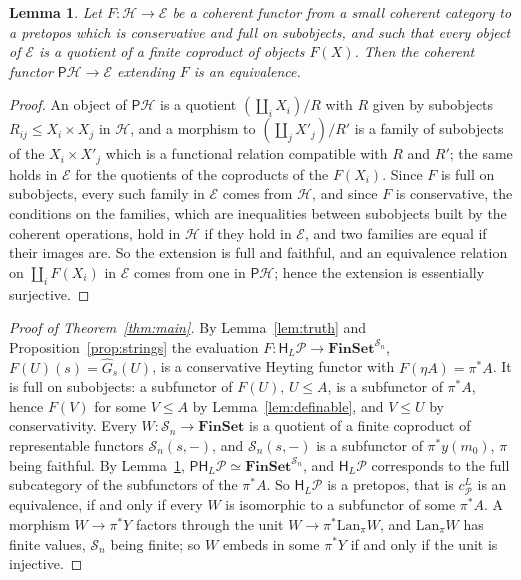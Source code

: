 \documentclass[11pt]{amsart}
\newtheorem{lem}[thm]{Lemma}
\theoremstyle{definition}
\newcommand{\Fin}{\mathbf{FinSet}}
\newcommand{\PP}{\mathsf P}
\newcommand{\HH}{\mathsf H}
\newcommand{\cP}{\mathcal P}
\newcommand{\cS}{\mathcal S}
\begin{document}
\begin{lem}\label{lem:PP}
Let $F\colon\mathcal H\to\mathcal E$ be a coherent functor from a small
coherent category to a pretopos which is conservative and full on
subobjects, and such that every object of $\mathcal E$ is a quotient of
a finite coproduct of objects $F(X)$. Then the coherent functor
$\PP\mathcal H\to\mathcal E$ extending $F$ is an equivalence.
\end{lem}
\begin{proof}
An object of $\PP\mathcal H$ is a quotient $(\coprod_iX_i)/R$ with $R$
given by subobjects $R_{ij}\le X_i\times X_j$ in $\mathcal H$, and a
morphism to $(\coprod_jX'_j)/R'$ is a family of subobjects of the
$X_i\times X'_j$ which is a functional relation compatible with $R$
and $R'$; the same holds in $\mathcal E$ for the quotients of the
coproducts of the $F(X_i)$. Since $F$ is full on subobjects, every
such family in $\mathcal E$ comes from $\mathcal H$, and since $F$ is
conservative, the conditions on the families, which are inequalities
between subobjects built by the coherent operations, hold in
$\mathcal H$ if they hold in $\mathcal E$, and two families are equal
if their images are. So the extension is full and faithful, and an
equivalence relation on $\coprod_iF(X_i)$ in $\mathcal E$ comes from
one in $\PP\mathcal H$; hence the extension is essentially surjective.
\end{proof}

\begin{proof}[Proof of Theorem~\ref{thm:main}]
By Lemma~\ref{lem:truth} and Proposition~\ref{prop:strings} the
evaluation $F\colon\HH_L\cP\to\Fin^{\cS_n}$, $F(U)(s)=\hat G_s(U)$, is
a conservative Heyting functor with $F(\eta A)=\pi^*A$. It is full on
subobjects: a subfunctor of $F(U)$, $U\le A$, is a subfunctor of
$\pi^*A$, hence $F(V)$ for some $V\le A$ by Lemma~\ref{lem:definable},
and $V\le U$ by conservativity. Every $W\colon\cS_n\to\Fin$ is a
quotient of a finite coproduct of representable functors $\cS_n(s,-)$,
and $\cS_n(s,-)$ is a subfunctor of $\pi^*y(m_0)$, $\pi$ being
faithful. By Lemma~\ref{lem:PP}, $\PP\HH_L\cP\simeq\Fin^{\cS_n}$, and
$\HH_L\cP$ corresponds to the full subcategory of the subfunctors of
the $\pi^*A$. So $\HH_L\cP$ is a pretopos, that is $c^L_\cP$ is an
equivalence, if and only if every $W$ is isomorphic to a subfunctor of
some $\pi^*A$. A morphism $W\to\pi^*Y$ factors through the unit
$W\to\pi^*\mathrm{Lan}_\pi W$, and $\mathrm{Lan}_\pi W$ has finite
values, $\cS_n$ being finite; so $W$ embeds in some $\pi^*Y$ if and
only if the unit is injective.
\end{proof}
\end{document}

